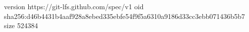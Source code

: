 version https://git-lfs.github.com/spec/v1
oid sha256:d46b4431b4aaf928a8ebed335ebfe54f9f5a6310a9186d33cc3ebb071436b5b7
size 524384
